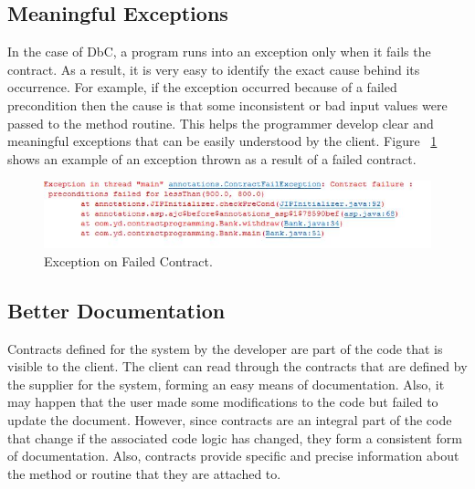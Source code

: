 \subsection{Meaningful Exceptions}
In the case of DbC, a program runs into an exception only when it fails the contract. As a result, it is very easy to identify the exact cause behind its occurrence. For example, if the exception occurred because of a failed precondition then the cause is that some inconsistent or bad input values were passed to the method routine. This helps the programmer develop clear and meaningful exceptions that can be easily understood by the client.
Figure ~\ref{fig:FailedContract} shows an example of an exception thrown as a result of a failed contract. 
\linebreak
\linebreak
\begin{figure}[htb]
\centering
\includegraphics[width=1.0\textwidth]{images/ContractFailedException.PNG}
\caption{Exception on Failed Contract.} 
\label{fig:FailedContract}
\end{figure}

\subsection{Better Documentation}
Contracts defined for the system by the developer are part of the code that is visible to the client. The client can read through the contracts that are defined by the supplier for the system, forming an easy means of documentation. Also, it may happen that the user made some modifications to the code but failed to update the document. However, since contracts are an integral part of the code that change if the associated code logic has changed, they form a consistent form of documentation. Also, contracts provide specific and precise information about the method or routine that they are attached to.

